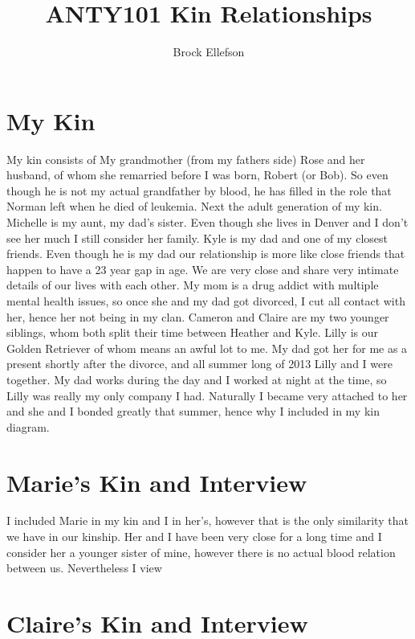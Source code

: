 \documentclass[12pt,a4paper]{article}
\author{Brock Ellefson}
\title{ANTY101 Kin Relationships}
\begin{document}
\doublespacing
\maketitle
\section*{My Kin}
My kin consists of My grandmother (from my fathers side) Rose and her husband, of whom she remarried before I was born, Robert (or Bob). So even though he is not my actual grandfather by blood, he has filled in the role that Norman left when he died of leukemia. Next the adult generation of my kin. Michelle is my aunt, my dad's sister. Even though she lives in Denver and I don't see her much I still consider her family. Kyle is my dad and one of my closest friends. Even though he is my dad our relationship is more like close friends that happen to have a 23 year gap in age. We are very close and share very intimate details of our lives with each other. My mom is a drug addict with multiple mental health issues, so once she and my dad got divorced, I cut all contact with her, hence her not being in my clan. Cameron and Claire are my two younger siblings, whom both split their time between Heather and Kyle. Lilly is our Golden Retriever of whom means an awful lot to me. My dad got her for me as a present shortly after the divorce, and all summer long of 2013 Lilly and I were together. My dad works during the day and I worked at night at the time, so Lilly was really my only company I had. Naturally I became very attached to her and she and I bonded greatly that summer, hence why I included in my kin diagram. 
\section*{Marie's Kin and Interview}
I included Marie in my kin and I in her's, however that is the only similarity that we have in our kinship. Her and I have been very close for a long time and I consider her a younger sister of mine, however there is no actual blood relation between us. Nevertheless I view 
\section*{Claire's Kin and Interview}
\end{document}
